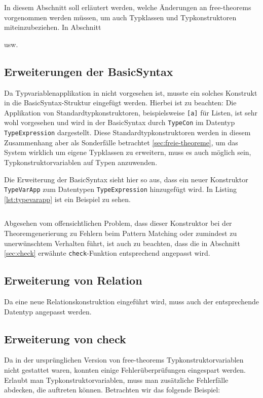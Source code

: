 \documentclass[11pt]{article} %
\begin{document}
In diesem Abschnitt soll erläutert werden, welche Änderungen an free-theorems vorgenommen werden müssen, um auch Typklassen und Typkonstruktoren miteinzubeziehen. In
Abschnitt 

usw.

\subsection{Erweiterungen der BasicSyntax}

Da Typvariablenapplikation in \cite{freetheorems} nicht vorgesehen ist, musste ein solches Konstrukt in die BasicSyntax-Struktur eingefügt werden. Hierbei ist zu beachten: Die Applikation
von Standardtypkonstruktoren, beispielsweise \texttt{[a]} für Listen, ist sehr wohl vorgesehen und wird in der BasicSyntax durch \texttt{TypeCon} im Datentyp \texttt{TypeExpression} dargestellt.  Diese Standardtypkonstruktoren werden in diesem Zusammenhang aber als Sonderfälle betrachtet \ref{sec:freie-theoreme}, um das System wirklich um eigene Typklassen zu erweitern, muss es auch möglich sein, Typkonstruktorvariablen auf Typen anzuwenden.

Die Erweiterung der BasicSyntax sieht hier so aus, dass ein neuer Konstruktor \texttt{TypeVarApp} zum Datentypen \texttt{TypeExpression} hinzugefügt wird. In Listing \ref{lst:typevarapp} ist ein Beispiel zu sehen.

\inputminted[tabsize=2]{haskell}{typevarapp.hs}

Abgesehen vom offensichtlichen Problem, dass dieser Konstruktor bei der Theoremgenerierung zu Fehlern beim Pattern Matching oder zumindest zu unerwünschtem Verhalten führt,
ist auch zu beachten, dass die in Abschnitt \ref{sec:check} erwähnte \texttt{check}-Funktion entsprechend angepasst wird.

\subsection{Erweiterung von Relation}

Da eine neue Relationskonstruktion eingeführt wird, muss auch der entsprechende Datentyp angepasst werden.

\subsection{Erweiterung von check}

Da in der ursprünglichen Version von free-theorems Typkonstruktorvariablen nicht gestattet waren, konnten einige
Fehlerüberprüfungen eingespart werden. Erlaubt man Typkonstruktorvariablen, muss man zusätzliche Fehlerfälle abdecken,
die auftreten können. Betrachten wir das folgende Beispiel:
\end{document}

